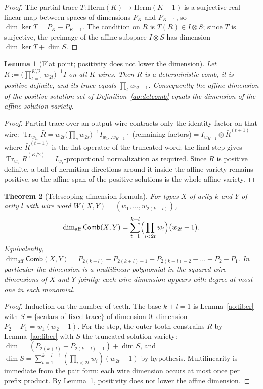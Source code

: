 \documentclass[11pt,a4paper]{article}
\theoremstyle{definition}
\theoremstyle{plain}
\newtheorem{theorem}{Theorem}[section]
\newtheorem{lemma}[theorem]{Lemma}
\theoremstyle{remark}
\DeclareMathOperator{\Tr}{Tr}
\newcommand{\Comb}{\mathsf{Comb}}
\newcommand{\affdim}{\dim_{\mathrm{aff}}}
\begin{document}
\begin{proof}
The partial trace
$T:\mathrm{Herm}(K)\to\mathrm{Herm}(K-1)$ is a surjective real linear map
between spaces of dimensions $P_K$ and $P_{K-1}$, so
$\dim\ker T=P_K-P_{K-1}$. The condition on $R$ is $T(R)\in I\otimes S$;
since $T$ is surjective, the preimage of the affine subspace $I\otimes S$
has dimension $\dim\ker T+\dim S$.
\end{proof}

\begin{lemma}[Flat point; positivity does not lower the dimension]
\label{ao:flat}
Let $\bar R:=\bigl(\prod_{t=1}^{K/2}w_{2t}\bigr)^{-1} I$ on all $K$ wires.
Then $\bar R$ is a deterministic comb, it is positive definite, and its
trace equals $\prod_{t}w_{2t-1}$. Consequently the affine dimension of the
positive solution set of Definition~\ref{ao:detcomb} equals the dimension of
the affine solution variety.
\end{lemma}

\begin{proof}
Partial trace over an output wire contracts only the identity factor on
that wire: $\Tr_{w_{2t}}\bar R = w_{2t}\bigl(\prod_s w_{2s}\bigr)^{-1}
I_{w_1\dots w_{K-1}} \cdot$ (remaining factors)$=I_{w_{K-1}}\otimes\bar
R^{(t+1)}$ where $\bar R^{(t+1)}$ is the flat operator of the truncated
word; the final step gives
$\Tr_{w_2}\bar R^{(K/2)}=I_{w_1}$-proportional normalization as required.
Since $\bar R$ is positive definite, a ball of hermitian directions around
it inside the affine variety remains positive, so the affine span of the
positive solutions is the whole affine variety.
\end{proof}

\begin{theorem}[Telescoping dimension formula]
\label{ao:telescope}
For types $X$ of arity $k$ and $Y$ of arity $l$ with wire word
$W(X,Y)=(w_1,\dots,w_{2(k+l)})$,
\[
\affdim\Comb(X,Y)
=\sum_{t=1}^{k+l}\Bigl(\prod_{i<2t} w_i\Bigr)\bigl(w_{2t}-1\bigr).
\]
Equivalently,
$\affdim\Comb(X,Y)=P_{2(k+l)}-P_{2(k+l)-1}+P_{2(k+l)-2}-\dots+P_2-P_1$.
In particular the dimension is a multilinear polynomial in the squared wire
dimensions of $X$ and $Y$ jointly: each wire dimension appears with degree
at most one in each monomial.
\end{theorem}

\begin{proof}
Induction on the number of teeth. The base $k+l=1$ is
Lemma~\ref{ao:fiber} with $S=\{$scalars of fixed trace$\}$ of dimension
$0$: dimension $P_2-P_1=w_1(w_2-1)$. For the step, the outer tooth
constrains $R$ by Lemma~\ref{ao:fiber} with $S$ the truncated solution
variety: $\dim = (P_{2(k+l)}-P_{2(k+l)-1})+\dim S$, and
$\dim S=\sum_{t=1}^{k+l-1}(\prod_{i<2t}w_i)(w_{2t}-1)$ by hypothesis.
Multilinearity is immediate from the pair form: each wire dimension occurs
at most once per prefix product. By Lemma~\ref{ao:flat}, positivity does
not lower the affine dimension.
\end{proof}
\end{document}

